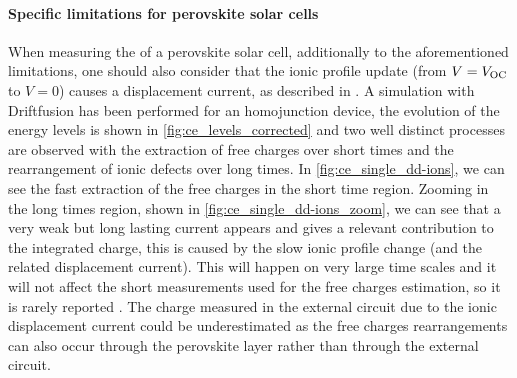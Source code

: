 	\begin{figure}
	\end{figure}

	\paragraph{Specific limitations for perovskite solar cells} \label{ce_limitations_perovskite}
	When measuring the  of a perovskite solar cell, additionally to the aforementioned limitations, one should also consider that the ionic profile update (from $V=V_\mathrm{OC}$ to $V=0$) causes a displacement current, as described in .
	A simulation with Driftfusion has been performed for an homojunction device, the evolution of the energy levels is shown in \cref{fig:ce_levels_corrected} and two well distinct processes are observed with the extraction of free charges over short times and the rearrangement of ionic defects over long times.
	In \cref{fig:ce_single_dd-ions}, we can see the fast extraction of the free charges in the short time region.
	Zooming in the long times region, shown in \cref{fig:ce_single_dd-ions_zoom}, we can see that a very weak but long lasting current appears and gives a relevant contribution to the integrated charge, this is caused by the slow ionic profile change (and the related displacement current).
	This will happen on very large time scales and it will not affect the short measurements used for the free charges estimation, so it is rarely reported \cite{ORegan2015b}.
	The charge measured in the external circuit due to the ionic displacement current could be underestimated as the free charges rearrangements can also occur through the perovskite layer rather than through the external circuit.

